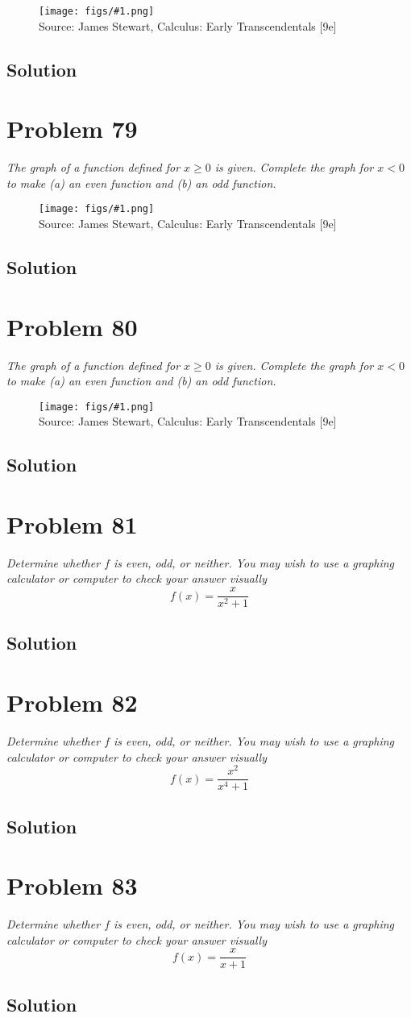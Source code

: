\documentclass[11pt]{article}
\newcommand{\soln}{\subsection*}
\newcommand{\qn}{\textit}
\newcommand{\imagesource}[1]{{\footnotesize Source: #1}}
\newcommand{\imgqn}[1]{
	\begin{figure}[h]
		\centering
		\texttt{[image: figs/\#1.png]}\\
		\imagesource{James Stewart, Calculus: Early Transcendentals [9e]}
	\end{figure}
}
\begin{document}
\imgqn{1.1.78}

\soln{Solution}

\section*{Problem 79}

\qn{The graph of a function defined for $x \ge 0$ is given. Complete the graph for $x<0$ to make (a) an even function and (b) an odd function.}

\imgqn{1.1.79}

\soln{Solution}

\section*{Problem 80}

\qn{The graph of a function defined for $x \ge 0$ is given. Complete the graph for $x<0$ to make (a) an even function and (b) an odd function.}

\imgqn{1.1.80}

\soln{Solution}

\section*{Problem 81}

\qn{Determine whether $f$ is even, odd, or neither. You may wish to use a graphing calculator or computer to check your answer visually $$f(x)=\frac{x}{x^2+1}$$}

\soln{Solution}

\section*{Problem 82}

\qn{Determine whether $f$ is even, odd, or neither. You may wish to use a graphing calculator or computer to check your answer visually $$f(x)=\frac{x^2}{x^4+1}$$}

\soln{Solution}

\section*{Problem 83}

\qn{Determine whether $f$ is even, odd, or neither. You may wish to use a graphing calculator or computer to check your answer visually $$f(x)=\frac{x}{x+1}$$}

\soln{Solution}
\end{document}
